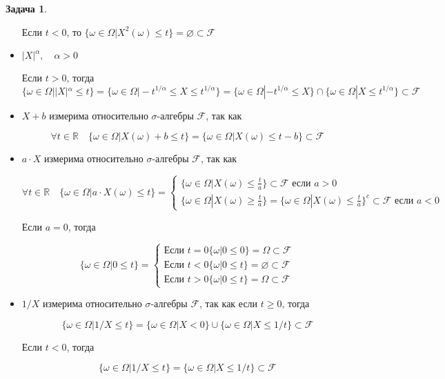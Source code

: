 \documentclass[pdftex, 12pt, a4paper]{article}
\def\R{\ensuremath{\mathbb{R}}} %
\def\F{\ensuremath{\mathcal{F}}} %
\def\s{\ensuremath{\sigma}}
\def \a{\alpha}
\def \Om{\Omega}
\def \om{\omega}
\renewcommand{\le}{\leqslant}
\renewcommand{\ge}{\geqslant}
\theoremstyle{definition} %
\newtheorem{problem}{Задача}
\numberwithin{problem}{section}
\numberwithin{blits}{section}
\begin{document}
\begin{problem}
\begin{sol}
\begin{itemize}
Если $t < 0$, то $\{\om \in \Om | X^2(\om) \le t \} = \varnothing \subset \F$



\item $|X|^{\a}, \quad \a >0$

Если $t>0$, тогда 
\[\{\om \in \Om | |X|^{\a} \le t\} = \{ \om \in \Om | -t^{1/ \a} \le X \le t^{1/ \a}\} = \{ \om \in \Om | -t^{1/ \a} \le X\} \cap \{ \om \in \Om | X \le t^{1/ \a}\} \subset \F \]



\item $X + b$ измерима относительно \s-алгебры \F, так как

\[ \forall t \in \R \quad \{\om \in \Om | X(\om) + b \le t\} = \{\om \in \Om | X(\om) \le t-b \} \subset \F \]

\item $a \cdot X$ измерима относительно \s-алгебры \F, так как

\[ \forall t \in \R \quad \{\om \in \Om | a \cdot X(\om) \le t \} = \begin{cases} \{\om \in \Om | X(\om) \le \frac{t}{a} \} \subset \F  \text{ если } a > 0  \\ \{\om \in \Om | X(\om) \ge \frac{t}{a} \} = \{\om \in \Om | X(\om) \le \frac{t}{a} \}^c \subset \F \text{ если } a < 0 \end{cases} \] 

Если $a = 0$, тогда


\[ \{ \om \in \Om | 0 \le t \} = \begin{cases} \text{Если } t=0 \{\om | 0 \le 0\} = \Om \subset \F \\ \text{Если } t<0 \{\om | 0 \le t\} = \varnothing \subset \F \\  \text{Если } t>0 \{\om | 0 \le t\} = \Om \subset \F                                                                       \end{cases} \]


\item $1/X$ измерима относительно \s-алгебры \F, так как если $t \ge 0$, тогда  

\[ \{\om \in \Om | 1/X \le t\} = \{ \om \in \Om | X < 0\} \cup \{ \om \in \Om | X \le 1/t \} \subset \F\]

Если $t < 0$, тогда 

\[\{\om \in \Om | 1/X \le t\} = \{\om \in \Om |X \le 1/t \} \subset \F \]



\end{itemize}
\end{sol}
\end{problem}
\end{document}
